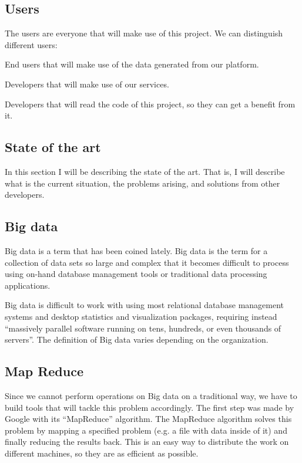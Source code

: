 \subsection{Users}

The users are everyone that will make use of this project. We can distinguish
different users:

\mylist
\item End users that will make use of the data generated from our platform.
\item Developers that will make use of our services.
\item Developers that will read the code of this project, so they can get a
benefit from it.
\mylistend

\subsection{State of the art}

In this section I will be describing the state of the art. That is, I will
describe what is the current situation, the problems arising, and solutions
from other developers.

\subsection{Big data}

Big data\cite{wikibigdata} is a term that has been coined lately. Big data is
the term for a collection of data sets so large and complex that it becomes
difficult to process using on-hand database management tools or traditional
data processing applications.

Big data is difficult to work with using most relational database management
systems and desktop statistics and visualization packages, requiring instead
``massively parallel software running on tens, hundreds, or even thousands of
servers''. The definition of Big data varies depending on the organization.

\subsection{Map Reduce}

Since we cannot perform operations on Big data on a traditional way, we have to
build tools that will tackle this problem accordingly. The first step was made
by Google with its ``MapReduce'' algorithm\cite{mapreduce}. The MapReduce
algorithm solves this problem by mapping a specified problem (e.g. a file with
data inside of it) and finally reducing the results back. This is an easy way
to distribute the work on different machines, so they are as efficient as
possible.

